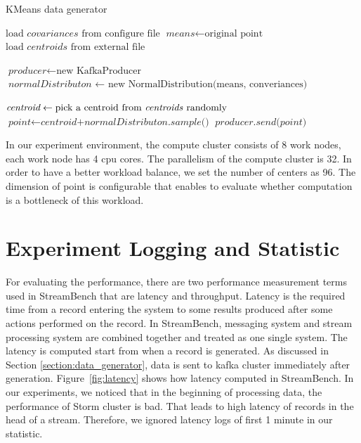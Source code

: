 \begin{algorithm}
\caption{KMeans data generator}\label{euclid}
\label{alg:kmeans_generator}
\begin{algorithmic}[1]
\State $\text{load } \textit{covariances} \text{ from configure file}$
\State $\textit{means} \gets \text{original point}$
\State $\text{load } \textit{centroids} \text{ from external file}$

\State $\textit{producer} \gets \text{new KafkaProducer}$ 
\State $\textit{normalDistributon } \gets \text{ new NormalDistribution(means, converiances)}$

\State $\textit{centroid} \gets \text{pick a centroid from \textit{centroids} randomly}$ 
\State $\textit{point} \gets \textit{centroid+normalDistributon.sample()}$ 
\State $\textit{producer.send(point)}$ 

\EndWhile
\end{algorithmic}
\end{algorithm}

In our experiment environment, the compute cluster consists of 8 work nodes, each work node has 4 cpu cores. The parallelism of the compute cluster is 32. In order to have a better workload balance, we set the number of centers as 96. The dimension of point is configurable that enables to evaluate whether computation is a bottleneck of this workload.

\section{Experiment Logging and Statistic}
\label{section:log_statistic}

For evaluating the performance, there are two performance measurement terms used in StreamBench that are latency and throughput. Latency is the required time from a record entering the system to some results produced after some actions performed on the record. In StreamBench, messaging system and stream processing system are combined together and treated as one single system. The latency is computed start from when a record is generated. As discussed in Section \ref{section:data_generator}, data is sent to kafka cluster immediately after generation. Figure~\ref{fig:latency} shows how latency computed in StreamBench. In our experiments, we noticed that in the beginning of processing data, the performance of Storm cluster is bad. That leads to high latency of records in the head of a stream. Therefore, we ignored latency logs of first 1 minute in our statistic.

